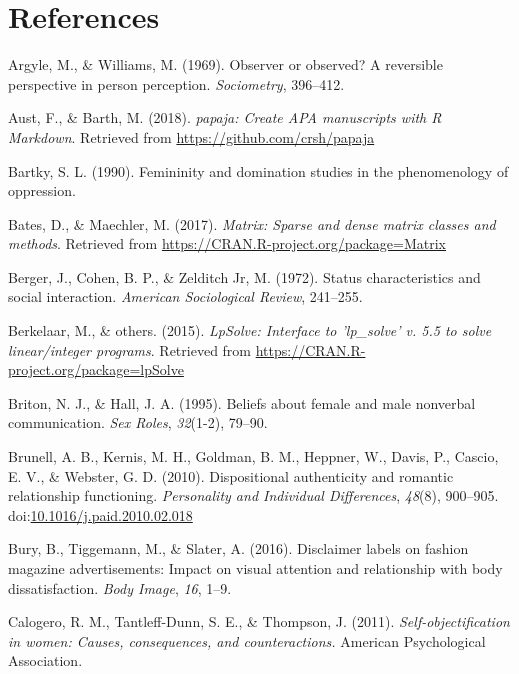 \documentclass[man]{apa6}
\begin{document}
\section{References}\label{references}

\newpage

\begingroup
\setlength{\parindent}{-0.5in} \setlength{\leftskip}{0.5in}

\hypertarget{refs}{}
\hypertarget{ref-argyle1969}{}
Argyle, M., \& Williams, M. (1969). Observer or observed? A reversible
perspective in person perception. \emph{Sociometry}, 396--412.

\hypertarget{ref-R-papaja}{}
Aust, F., \& Barth, M. (2018). \emph{papaja: Create APA manuscripts with
R Markdown}. Retrieved from \url{https://github.com/crsh/papaja}

\hypertarget{ref-Bartky}{}
Bartky, S. L. (1990). Femininity and domination studies in the
phenomenology of oppression.

\hypertarget{ref-R-Matrix}{}
Bates, D., \& Maechler, M. (2017). \emph{Matrix: Sparse and dense matrix
classes and methods}. Retrieved from
\url{https://CRAN.R-project.org/package=Matrix}

\hypertarget{ref-berger1972}{}
Berger, J., Cohen, B. P., \& Zelditch Jr, M. (1972). Status
characteristics and social interaction. \emph{American Sociological
Review}, 241--255.

\hypertarget{ref-R-lpSolve}{}
Berkelaar, M., \& others. (2015). \emph{LpSolve: Interface to
'lp\_solve' v. 5.5 to solve linear/integer programs}. Retrieved from
\url{https://CRAN.R-project.org/package=lpSolve}

\hypertarget{ref-briton1995}{}
Briton, N. J., \& Hall, J. A. (1995). Beliefs about female and male
nonverbal communication. \emph{Sex Roles}, \emph{32}(1-2), 79--90.

\hypertarget{ref-brunelletal2010}{}
Brunell, A. B., Kernis, M. H., Goldman, B. M., Heppner, W., Davis, P.,
Cascio, E. V., \& Webster, G. D. (2010). Dispositional authenticity and
romantic relationship functioning. \emph{Personality and Individual
Differences}, \emph{48}(8), 900--905.
doi:\href{https://doi.org/10.1016/j.paid.2010.02.018}{10.1016/j.paid.2010.02.018}

\hypertarget{ref-bury2016}{}
Bury, B., Tiggemann, M., \& Slater, A. (2016). Disclaimer labels on
fashion magazine advertisements: Impact on visual attention and
relationship with body dissatisfaction. \emph{Body Image}, \emph{16},
1--9.

\hypertarget{ref-calogero2011}{}
Calogero, R. M., Tantleff-Dunn, S. E., \& Thompson, J. (2011).
\emph{Self-objectification in women: Causes, consequences, and
counteractions.} American Psychological Association.
\end{document}
